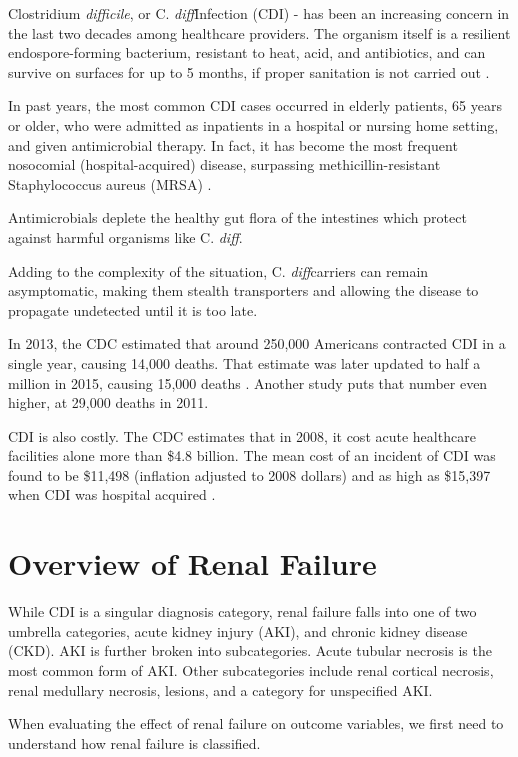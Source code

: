 \documentclass[12pt]{ociamthesis}\usepackage[]{graphicx}\usepackage[]{color}
\newcommand{\cdifficile}{Clostridium \textit{difficile}}
\newcommand{\cdiff}{C. \textit{diff}}
\begin{document}
\cdifficile, or \cdiff Infection (CDI) -
has been an increasing concern in the last two decades among healthcare providers. 
The organism itself is a resilient endospore-forming bacterium, resistant to heat, acid, and antibiotics,
and can survive on surfaces for up to 5 months, if proper sanitation is not carried out \cite{Gerding2008}.

In past years, the most common CDI cases occurred in elderly patients, 65 years or older,
who were admitted as inpatients in a hospital or nursing home setting, and given antimicrobial therapy.
In fact, it has become the most frequent nosocomial (hospital-acquired) disease, surpassing
methicillin-resistant Staphylococcus aureus (MRSA) \cite{Gupta2014}.

Antimicrobials deplete the healthy gut flora of the intestines which protect against harmful organisms like \cdiff \cite{Lamont2017}.

Adding to the complexity of the situation, \cdiff carriers can remain asymptomatic, making them stealth transporters
and allowing the disease to propagate undetected until it is too late. 

In 2013, the CDC estimated that around 250,000 Americans contracted CDI in a single year, causing 14,000 deaths.
That estimate was later updated to half a million in 2015, causing 15,000 deaths \cite{CDC2015, CDC2018}.
Another study puts that number even higher, at 29,000 deaths in 2011. 

CDI is also costly. The CDC estimates that in 2008, it cost acute healthcare facilities alone more than \$4.8 billion.
The mean cost of an incident of CDI was found to be \$11,498 (inflation adjusted to 2008 dollars)
and as high as \$15,397 when CDI was hospital acquired \cite{Dubberke2012}.


\section{Overview of Renal Failure}

While CDI is a singular diagnosis category, renal failure falls into one of two umbrella categories, acute kidney injury (AKI), 
and chronic kidney disease (CKD). AKI is further broken into subcategories. Acute tubular necrosis is the most common form of AKI.
Other subcategories include renal cortical necrosis, renal medullary necrosis, lesions, and a category for unspecified AKI. 

When evaluating the effect of renal failure on outcome variables, we first need to understand how renal failure is classified.
\end{document}
